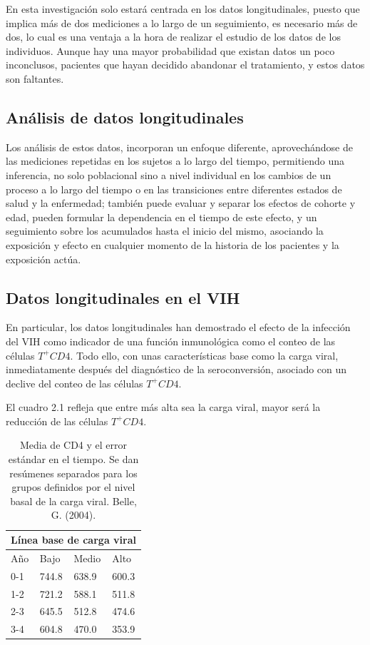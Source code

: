 	En esta  investigaci\'on solo estar\'a centrada en los datos longitudinales, puesto que implica m\'as de dos mediciones a lo largo de un seguimiento, es necesario m\'as de dos, lo cual es una ventaja a la hora de realizar el estudio de los datos de los individuos. Aunque hay una mayor probabilidad que existan datos un poco inconclusos, pacientes que hayan decidido abandonar el tratamiento, y estos datos son faltantes.

	
	\subsection{An\'alisis de datos longitudinales}
	
	Los an\'alisis de estos datos, incorporan un enfoque diferente, aprovech\'andose de las mediciones repetidas en los sujetos a lo largo del tiempo, permitiendo una inferencia, no solo poblacional sino a nivel individual en los cambios de un proceso a lo largo del tiempo o en las transiciones entre diferentes estados de salud y la enfermedad; tambi\'en puede evaluar y separar los efectos de cohorte y edad, pueden formular la dependencia en el tiempo de este efecto, y un seguimiento sobre los acumulados hasta el inicio del mismo, asociando la exposici\'on y efecto en cualquier momento de la historia de los pacientes y la exposici\'on act\'ua. \citet{delgado} 

\subsection{Datos longitudinales en el VIH}

	En particular, los datos longitudinales han demostrado el efecto de la infecci\'on del VIH como indicador de una funci\'on inmunol\'ogica como el conteo de las c\'elulas $T^{+}CD4$. Todo ello, con unas caracter\'isticas base como la carga viral, inmediatamente despu\'es del diagn\'ostico de la seroconversi\'on, asociado con un declive del conteo de las c\'elulas $T^{+}CD4$. \textit{\citet{belle}}
	
	El cuadro 2.1 refleja que entre m\'as alta sea la carga viral, mayor ser\'a la reducci\'on de las c\'elulas $T^{+}CD4$.
	
\begin{table}[H]
\begin{center}
\begin{tabular}{|l|l|l|l|}
\hline
\multicolumn{4}{|c|}{L\'inea base de carga viral} \\ \hline
A\~no & Bajo & Medio & Alto \\ \hline
0-1 & 744.8 & 638.9 & 600.3 \\ \hline
1-2 & 721.2 & 588.1 & 511.8 \\ \hline
2-3 & 645.5 & 512.8 & 474.6 \\ \hline
3-4 & 604.8 & 470.0 & 353.9 \\ \hline

\end{tabular}
\caption{Media de CD4 y el error est\'andar en el tiempo. Se dan res\'umenes separados para los grupos definidos por el nivel basal de la carga viral. Belle, G. (2004).}
\label{tabla:cd4}
\end{center}
\end{table}	


